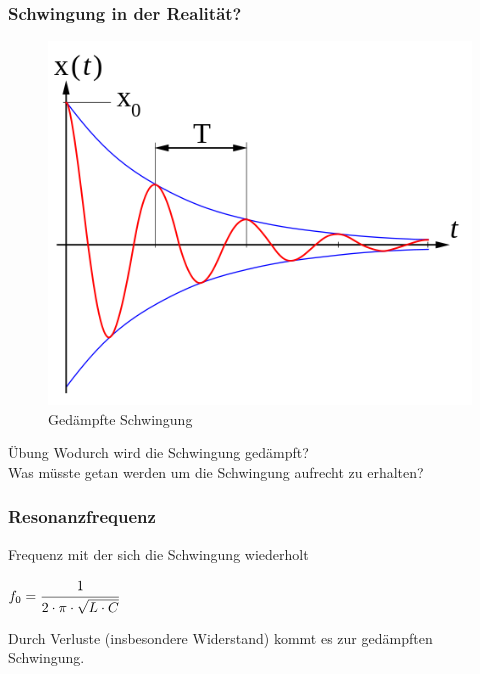 \begin{frame}
  \frametitle{Schwingung in der Realität?}
  \begin{center}
    \begin{figure}
      \includegraphics[width=.8\textwidth,height=.75\textheight,keepaspectratio]{e07/Damped_oscillation_graph.png}
      \caption{Gedämpfte Schwingung}
    \end{figure}
  \end{center}
  \begin{block}{Übung}
    Wodurch wird die Schwingung gedämpft? \\
    Was müsste getan werden um die Schwingung aufrecht zu erhalten?
  \end{block}
\end{frame}

\begin{frame}
  \frametitle{Resonanzfrequenz}
  \begin{block}{Frequenz mit der sich die Schwingung wiederholt}
    \begin{center}
      \Huge{$ f_{0} = \cfrac{1}{2 \cdot \pi \cdot \sqrt{L \cdot C}} $}
    \end{center}
  \end{block}
  \pause
  Durch Verluste (insbesondere Widerstand) kommt es zur gedämpften Schwingung.
\end{frame}

